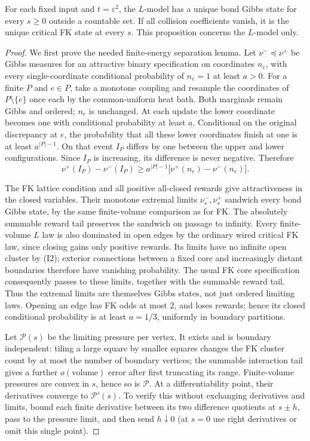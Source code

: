 \begin{proposition}\label{prop:Lunique}
For each fixed input and $t=\varepsilon^2$, the $L$-model has a unique bond Gibbs state for every $s\ge0$ outside a countable set. If all collision coefficients vanish, it is the unique critical FK state at every $s$. This proposition concerns the $L$-model only.
\end{proposition}
\begin{proof}
We first prove the needed finite-energy separation lemma. Let $\nu^-\preceq\nu^+$ be Gibbs measures for an attractive binary specification on coordinates $n_e$, with every single-coordinate conditional probability of $n_e=1$ at least $a>0$. For a finite $P$ and $e\in P$, take a monotone coupling and resample the coordinates of $P\setminus\{e\}$ once each by the common-uniform heat bath. Both marginals remain Gibbs and ordered; $n_e$ is unchanged. At each update the lower coordinate becomes one with conditional probability at least $a$. Conditional on the original discrepancy at $e$, the probability that all these lower coordinates finish at one is at least $a^{|P|-1}$. On that event $I_P$ differs by one between the upper and lower configurations. Since $I_P$ is increasing, its difference is never negative. Therefore
\begin{equation}\label{eq:separation}
 \nu^+(I_P)-\nu^-(I_P)\ge
 a^{|P|-1}\bigl[\nu^+(n_e)-\nu^-(n_e)\bigr].
\end{equation}

The FK lattice condition and all positive all-closed rewards give attractiveness in the closed variables. Their monotone extremal limits $\nu_s^-,\nu_s^+$ sandwich every bond Gibbs state, by the same finite-volume comparison as for FK. The absolutely summable reward tail preserves the sandwich on passage to infinity. Every finite-volume $L$ law is also dominated in open edges by the ordinary wired critical FK law, since closing gains only positive rewards. Its limits have no infinite open cluster by (I2); exterior connections between a fixed core and increasingly distant boundaries therefore have vanishing probability. The usual FK core specification consequently passes to these limits, together with the summable reward tail. Thus the extremal limits are themselves Gibbs states, not just ordered limiting laws. Opening an edge has FK odds at most $2$, and loses rewards; hence its closed conditional probability is at least $a=1/3$, uniformly in boundary partitions.

Let $\mathcal P(s)$ be the limiting pressure per vertex. It exists and is boundary independent: tiling a large square by smaller squares changes the FK cluster count by at most the number of boundary vertices; the summable interaction tail gives a further $o(\text{volume})$ error after first truncating its range. Finite-volume pressures are convex in $s$, hence so is $\mathcal P$. At a differentiability point, their derivatives converge to $\mathcal P'(s)$. To verify this without exchanging derivatives and limits, bound each finite derivative between its two difference quotients at $s\pm h$, pass to the pressure limit, and then send $h\downarrow0$ (at $s=0$ use right derivatives or omit this single point).


\end{proof}
